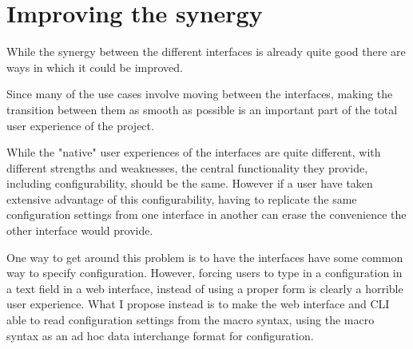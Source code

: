 

\section{Improving the synergy}

While the synergy between the different interfaces is already quite good there are ways in which it could be improved.

Since many of the use cases involve moving between the interfaces, making the transition between them as smooth as possible is an important part of the total user experience of the project.

While the "native" user experiences of the interfaces are quite different, with different strengths and weaknesses, the central functionality they provide, including configurability, should be the same. However if a user have taken extensive advantage of this configurability, having to replicate the same configuration settings from one interface in another can erase the convenience the other interface would provide.

One way to get around this problem is to have the interfaces have some common way to specify configuration. However, forcing users to type in a configuration in a text field in a web interface, instead of using a proper form is clearly a horrible user experience. What I propose instead is to make the web interface and CLI able to read configuration settings from the macro syntax, using the macro syntax as an ad hoc data interchange format for configuration.



